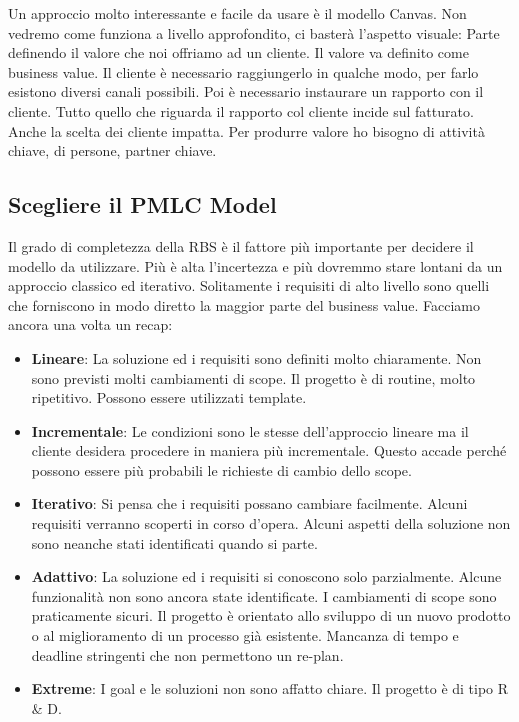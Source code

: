 \noindent Un approccio molto interessante e facile da usare è il modello Canvas. Non vedremo come funziona a livello approfondito, ci basterà l'aspetto visuale:
Parte definendo il valore che noi offriamo ad un cliente. Il valore va definito come business value. Il cliente è necessario raggiungerlo in qualche modo, per farlo esistono diversi canali possibili. Poi è necessario instaurare un rapporto con il cliente. Tutto quello che riguarda il rapporto col cliente incide sul fatturato. Anche la scelta dei cliente impatta. Per produrre valore ho bisogno di attività chiave, di persone, partner chiave.
\subsection{Scegliere il PMLC Model}
Il grado di completezza della RBS è il fattore più importante per decidere il modello da utilizzare. Più è alta l'incertezza e più dovremmo stare lontani da un approccio classico ed iterativo.\newline
Solitamente i requisiti di alto livello sono quelli che forniscono in modo diretto la maggior parte del business value. Facciamo ancora una volta un recap:
\begin{itemize}
	\item \textbf{Lineare}: La soluzione ed i requisiti sono definiti molto chiaramente. Non sono previsti molti cambiamenti di scope. Il progetto è di routine, molto ripetitivo. Possono essere utilizzati template.
	\item \textbf{Incrementale}: Le condizioni sono le stesse dell'approccio lineare ma il cliente desidera procedere in maniera più incrementale. Questo accade perché possono essere più probabili le richieste di cambio dello scope.
	\item \textbf{Iterativo}: Si pensa che i requisiti possano cambiare facilmente. Alcuni requisiti verranno scoperti in corso d'opera. Alcuni aspetti della soluzione non sono neanche stati identificati quando si parte.
	\item \textbf{Adattivo}: La soluzione ed i requisiti si conoscono solo parzialmente. Alcune funzionalità non sono ancora state identificate. I cambiamenti di scope sono praticamente sicuri.  Il progetto è orientato allo sviluppo di un nuovo prodotto o al miglioramento di un processo già esistente. Mancanza di tempo e deadline stringenti che non permettono un re-plan.
	\item \textbf{Extreme}: I goal e le soluzioni non sono affatto chiare. Il progetto è di tipo R \& D.
\end{itemize}
